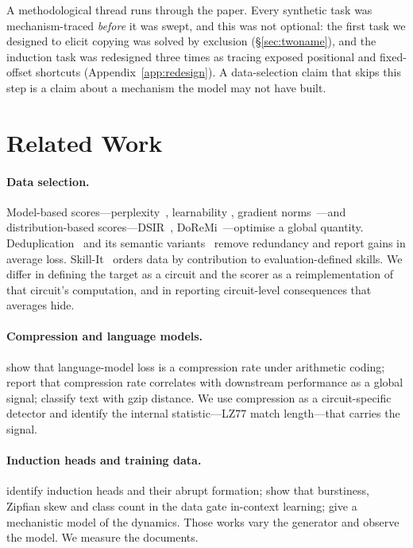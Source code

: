 \documentclass[11pt]{article}
\begin{document}
A methodological thread runs through the paper. Every synthetic task was
mechanism-traced \emph{before} it was swept, and this was not optional: the
first task we designed to elicit copying was solved by exclusion
(\S\ref{sec:twoname}), and the induction task was redesigned three times as
tracing exposed positional and fixed-offset shortcuts
(Appendix~\ref{app:redesign}). A data-selection claim that skips this step
is a claim about a mechanism the model may not have built.

\section{Related Work}

\paragraph{Data selection.}
Model-based scores---perplexity~\citep{wenzek2020ccnet}, learnability
\citep{mindermann2022rho}, gradient norms~\citep{paul2021el2n}---and
distribution-based scores---DSIR~\citep{xie2023dsir},
DoReMi~\citep{xie2023doremi}---optimise a global quantity.
Deduplication~\citep{lee2022dedup} and its semantic
variants~\citep{abbas2023semdedup,tirumala2023d4} remove redundancy and
report gains in average loss. Skill-It~\citep{chen2023skillit} orders data
by contribution to evaluation-defined skills. We differ in defining the
target as a circuit and the scorer as a reimplementation of that circuit's
computation, and in reporting circuit-level consequences that averages
hide.

\paragraph{Compression and language models.}
\citet{deletang2023compression} show that language-model loss is a
compression rate under arithmetic coding; \citet{huang2024compression}
report that compression rate correlates with downstream performance as a
global signal; \citet{jiang2023gzip} classify text with gzip distance. We
use compression as a circuit-specific detector and identify the internal
statistic---LZ77 match length---that carries the signal.

\paragraph{Induction heads and training data.}
\citet{olsson2022induction} identify induction heads and their abrupt
formation; \citet{chan2022data} show that burstiness, Zipfian skew and
class count in the data gate in-context learning; \citet{reddy2023mechanistic}
give a mechanistic model of the dynamics. Those works vary the generator
and observe the model. We measure the documents.
\end{document}
